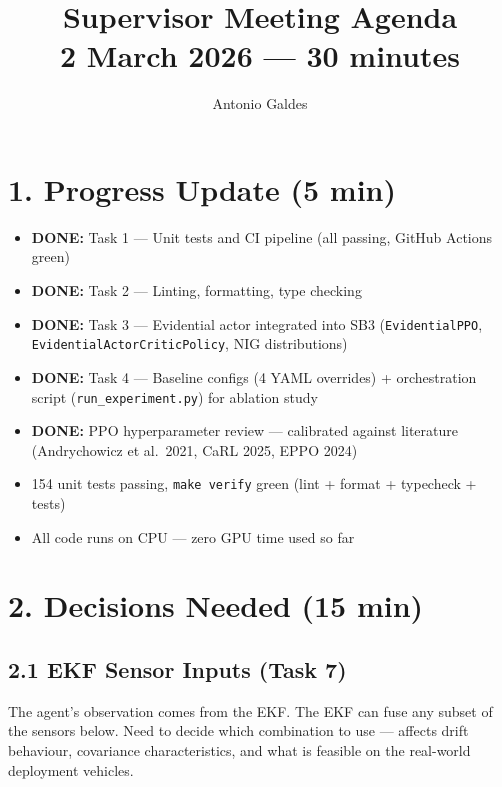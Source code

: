 \documentclass[11pt,a4paper]{article}
\title{Supervisor Meeting Agenda\\
\large 2 March 2026 --- 30 minutes}
\author{Antonio Galdes}
\date{}
\newcommand{\done}[1]{\textcolor{done}{\textbf{DONE:}} #1}
\begin{document}
\maketitle

\section*{1. Progress Update (5 min)}

\begin{itemize}[leftmargin=*]
  \item \done{Task 1 --- Unit tests and CI pipeline (all passing, GitHub Actions green)}
  \item \done{Task 2 --- Linting, formatting, type checking}
  \item \done{Task 3 --- Evidential actor integrated into SB3
    (\texttt{EvidentialPPO}, \texttt{EvidentialActorCriticPolicy}, NIG distributions)}
  \item \done{Task 4 --- Baseline configs (4 YAML overrides) + orchestration script
    (\texttt{run\_experiment.py}) for ablation study}
  \item \done{PPO hyperparameter review --- calibrated against literature
    (Andrychowicz et al.\ 2021, CaRL 2025, EPPO 2024)}
  \item 154 unit tests passing, \texttt{make verify} green (lint + format + typecheck + tests)
  \item All code runs on CPU --- zero GPU time used so far
\end{itemize}

\section*{2. Decisions Needed (15 min)}

\subsection*{2.1 EKF Sensor Inputs (Task 7)}

The agent's observation comes from the EKF. The EKF can fuse any subset of the sensors below. Need to decide which combination to use --- affects drift behaviour, covariance characteristics, and what is feasible on the real-world deployment vehicles.
\end{document}
